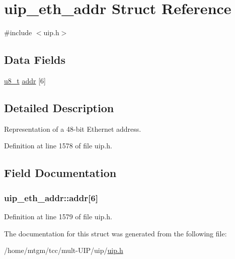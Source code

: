 \hypertarget{structuip__eth__addr}{
\section{uip\_\-eth\_\-addr Struct Reference}
\label{structuip__eth__addr}
}


{\ttfamily \#include $<$uip.h$>$}

\subsection*{Data Fields}
\begin{DoxyCompactItemize}
\item 
\hyperlink{group__uipfw_ga4caecabca98b43919dd11be1c0d4cd8e}{u8\_\-t} \hyperlink{structuip__eth__addr_aaacd5fa1806e0f0dd0bc96dd36507ad8}{addr} \mbox{[}6\mbox{]}
\end{DoxyCompactItemize}


\subsection{Detailed Description}
Representation of a 48-\/bit Ethernet address. 

Definition at line 1578 of file uip.h.



\subsection{Field Documentation}
\hypertarget{structuip__eth__addr_aaacd5fa1806e0f0dd0bc96dd36507ad8}{
\subsubsection[{addr}]{ {\bf uip\_\-eth\_\-addr::addr}\mbox{[}6\mbox{]}}}
\label{structuip__eth__addr_aaacd5fa1806e0f0dd0bc96dd36507ad8}


Definition at line 1579 of file uip.h.



The documentation for this struct was generated from the following file:\begin{DoxyCompactItemize}
\item 
/home/mtgm/tcc/mult-\/UIP/uip/\hyperlink{uip_8h}{uip.h}\end{DoxyCompactItemize}
